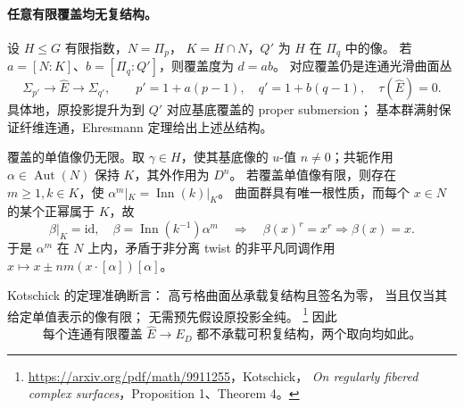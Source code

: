 \documentclass[UTF8,fontset=fandol,zihao=-4,oneside,openany]{ctexbook}
\theoremstyle{cjkplain}
\numberwithin{equation}{chapter}
\begin{document}
\paragraph{任意有限覆盖均无复结构。}
设 \(H\le G\) 有限指数，\(N=\Pi_p\)，
\(K=H\cap N\)，\(Q'\) 为 \(H\) 在 \(\Pi_q\) 中的像。
若 \(a=[N:K]\)、\(b=[\Pi_q:Q']\)，则覆盖度为 \(d=ab\)。
对应覆盖仍是连通光滑曲面丛
\[
 \Sigma_{p'}\longrightarrow\widehat E\longrightarrow\Sigma_{q'},
 \qquad p'=1+a(p-1),\quad q'=1+b(q-1),\quad
 \tau(\widehat E)=0.
\]
具体地，原投影提升为到 \(Q'\) 对应基底覆盖的 proper submersion；
基本群满射保证纤维连通，Ehresmann 定理给出上述丛结构。

覆盖的单值像仍无限。取 \(\gamma\in H\)，使其基底像的
\(u\)-值 \(n\ne0\)；共轭作用 \(\alpha\in\operatorname{Aut}(N)\)
保持 \(K\)，其外作用为 \(D^n\)。
若覆盖单值像有限，则存在 \(m\ge1,k\in K\)，使
\(\alpha^m|_K=\operatorname{Inn}(k)|_K\)。
曲面群具有唯一根性质，而每个 \(x\in N\) 的某个正幂属于 \(K\)，故
\[
 \beta|_K=\mathrm{id},\quad
 \beta=\operatorname{Inn}(k^{-1})\alpha^m
 \quad\Longrightarrow\quad
 \beta(x)^r=x^r\Longrightarrow\beta(x)=x.
\]
于是 \(\alpha^m\) 在 \(N\) 上内，矛盾于非分离 twist 的非平凡同调作用
\(x\mapsto x\pm nm(x\cdot[\alpha])[\alpha]\)。

Kotschick 的定理准确断言：
高亏格曲面丛承载复结构且签名为零，
当且仅当其给定单值表示的像有限；
无需预先假设原投影全纯。%
\footnote{\url{https://arxiv.org/pdf/math/9911255}，Kotschick，
\emph{On regularly fibered complex surfaces}，Proposition 1、Theorem 4。}
因此
\begin{equation}
 \text{每个连通有限覆盖 }\widehat E\to E_D
 \text{ 都不承载可积复结构，两个取向均如此。}
 \label{BUNTOP:no-complex-cover}
\end{equation}
\end{document}
